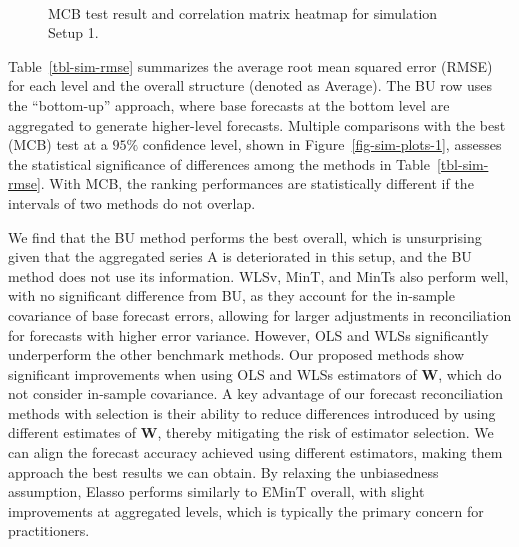 \documentclass[
  11pt]{article}
\theoremstyle{plain}
\theoremstyle{remark}
\begin{document}
\begin{figure}

\begin{minipage}{0.48\linewidth}



\end{minipage}%
%
\begin{minipage}{0.04\linewidth}
~\end{minipage}%
%
\begin{minipage}{0.48\linewidth}



\end{minipage}%

\caption{\label{fig-sim-plots}MCB test result and correlation matrix
heatmap for simulation Setup 1.}

\end{figure}%

Table~\ref{tbl-sim-rmse} summarizes the average root mean squared error
(RMSE) for each level and the overall structure (denoted as Average).
The BU row uses the ``bottom-up'' approach, where base forecasts at the
bottom level are aggregated to generate higher-level forecasts. Multiple
comparisons with the best (MCB) test at a \(95\%\) confidence level,
shown in Figure~\ref{fig-sim-plots-1}, assesses the statistical
significance of differences among the methods in
Table~\ref{tbl-sim-rmse}. With MCB, the ranking performances are
statistically different if the intervals of two methods do not overlap.

We find that the BU method performs the best overall, which is
unsurprising given that the aggregated series A is deteriorated in this
setup, and the BU method does not use its information. WLSv, MinT, and
MinTs also perform well, with no significant difference from BU, as they
account for the in-sample covariance of base forecast errors, allowing
for larger adjustments in reconciliation for forecasts with higher error
variance. However, OLS and WLSs significantly underperform the other
benchmark methods. Our proposed methods show significant improvements
when using OLS and WLSs estimators of \(\bm{W}\), which do not consider
in-sample covariance. A key advantage of our forecast reconciliation
methods with selection is their ability to reduce differences introduced
by using different estimates of \(\bm{W}\), thereby mitigating the risk
of estimator selection. We can align the forecast accuracy achieved
using different estimators, making them approach the best results we can
obtain. By relaxing the unbiasedness assumption, Elasso performs
similarly to EMinT overall, with slight improvements at aggregated
levels, which is typically the primary concern for practitioners.
\end{document}
